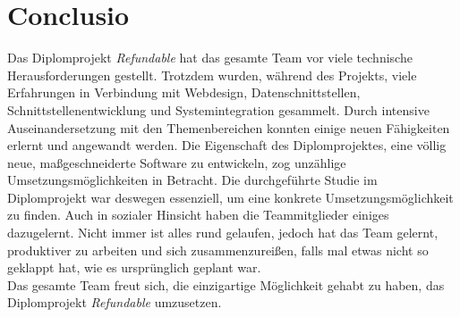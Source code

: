 \chapter{Conclusio}
Das Diplomprojekt \textit{Refundable} hat das gesamte Team vor viele technische Herausforderungen gestellt. Trotzdem wurden, während des Projekts, viele Erfahrungen in Verbindung mit Webdesign, Datenschnittstellen, Schnittstellenentwicklung und Systemintegration gesammelt. Durch intensive Auseinandersetzung mit den Themenbereichen konnten einige neuen Fähigkeiten erlernt und angewandt werden. Die Eigenschaft des Diplomprojektes, eine völlig neue, maßgeschneiderte Software zu entwickeln, zog unzählige Umsetzungsmöglichkeiten in Betracht. Die durchgeführte Studie im Diplomprojekt war deswegen essenziell, um eine konkrete Umsetzungsmöglichkeit zu finden. Auch in sozialer Hinsicht haben die Teammitglieder einiges dazugelernt. Nicht immer ist alles rund gelaufen, jedoch hat das Team gelernt, produktiver zu arbeiten und sich zusammenzureißen, falls mal etwas nicht so geklappt hat, wie es ursprünglich geplant war.\\Das gesamte Team freut sich, die einzigartige Möglichkeit gehabt zu haben, das Diplomprojekt \textit{Refundable} umzusetzen.